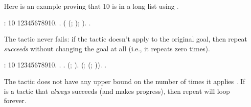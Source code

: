 \documentclass[12pt]{report}
\begin{document}
    Here is an example proving that 10 is in a long list using
    . 
\begin{coqdoccode}
\coqdocemptyline
\coqdocnoindent
{}  :  10 \coqdocnotation{[}1\coqdocnotation{;}2\coqdocnotation{;}3\coqdocnotation{;}4\coqdocnotation{;}5\coqdocnotation{;}6\coqdocnotation{;}7\coqdocnotation{;}8\coqdocnotation{;}9\coqdocnotation{;}10\coqdocnotation{]}.\coqdoceol
\coqdocnoindent
{}.\coqdoceol
\coqdocindent{1.00em}
 ( (; ); ).\coqdoceol
\coqdocnoindent
{}.\coqdoceol
\coqdocemptyline
\end{coqdoccode}
The tactic   never fails: if the tactic  doesn't apply
    to the original goal, then repeat \textit{succeeds} without changing the
    goal at all (i.e., it repeats zero times). 
\begin{coqdoccode}
\coqdocemptyline
\coqdocnoindent
{}  :  10 \coqdocnotation{[}1\coqdocnotation{;}2\coqdocnotation{;}3\coqdocnotation{;}4\coqdocnotation{;}5\coqdocnotation{;}6\coqdocnotation{;}7\coqdocnotation{;}8\coqdocnotation{;}9\coqdocnotation{;}10\coqdocnotation{]}.\coqdoceol
\coqdocnoindent
{}.\coqdoceol
\coqdocindent{1.00em}
 .\coqdoceol
\coqdocindent{1.00em}
 (; ).\coqdoceol
\coqdocindent{1.00em}
 (;  (; )).\coqdoceol
\coqdocnoindent
{}.\coqdoceol
\coqdocemptyline
\end{coqdoccode}
The tactic   does not have any upper bound on the
    number of times it applies .  If  is a tactic that \textit{always}
    succeeds (and makes progress), then repeat  will loop
    forever. 
\end{document}
